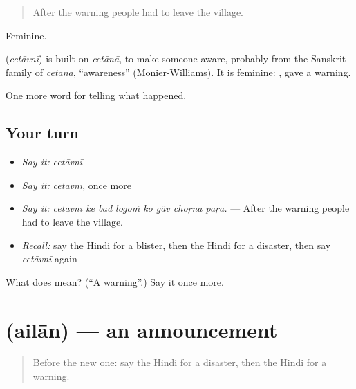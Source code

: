 \begin{quote}
After the warning people had to leave the village.
\end{quote}

Feminine.

\begin{cousinweb}
\textbf{} (\emph{cetāvnī}) is built on \emph{cetānā}, to make someone aware, probably from the Sanskrit family of \emph{cetana}, \textquotedblleft{}awareness\textquotedblright{} (Monier-Williams). It is feminine: \textbf{ }, gave a warning.
\end{cousinweb}

\begin{grammarlens}[title={What you've built}]
One more word for telling what happened.
\end{grammarlens}

\subsection*{Your turn}
\begin{itemize}
\raggedright
  \item \emph{Say it:} \emph{cetāvnī}
  \item \emph{Say it:} \emph{cetāvnī}, once more
  \item \emph{Say it:} \emph{cetāvnī ke bād logoṁ ko gā̃v choṛnā paṛā.} — After the warning people had to leave the village.
  \item \emph{Recall:} say the Hindi for a blister, then the Hindi for a disaster, then say \emph{cetāvnī} again
\end{itemize}

\begin{tcolorbox}[breakable,colback=teal!4,colframe=teal!35!black,title={Before you move on}]
What does  mean? (\textquotedblleft{}A warning\textquotedblright{}.) Say it once more.
\end{tcolorbox}
\section[\texorpdfstring{\hi{ऐलान} (ailān)}{ऐलान (ailān)}]{ (ailān) — an announcement}

\label{lesson:HI-C302-ailan}



\begin{quote}
Before the new one: say the Hindi for a disaster, then the Hindi for a warning.
\end{quote}

